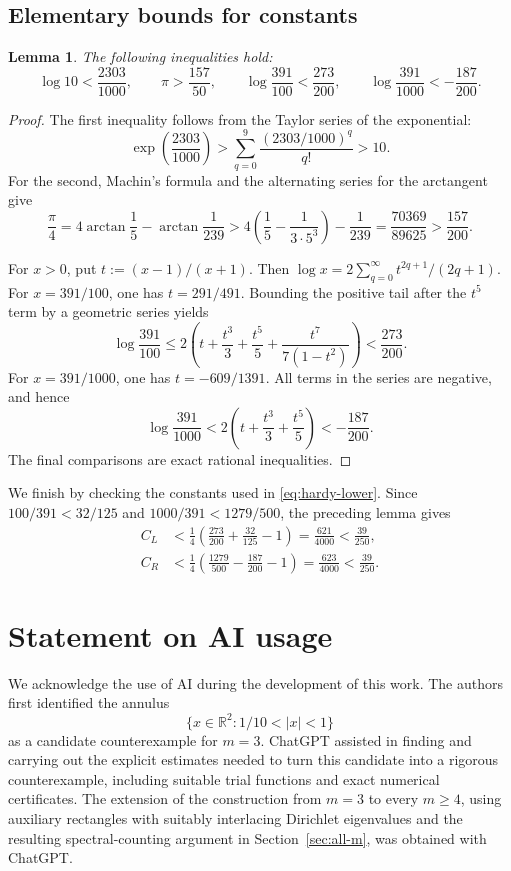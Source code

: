 \documentclass[11pt,letterpaper,reqno]{amsart}
\newtheorem{lemma}[lemma]{Lemma}
\theoremstyle{definition}
\begin{document}
\subsection{Elementary bounds for constants}

\begin{lemma}\label{lem:elementary-constants}
The following inequalities hold:
\[
 \log 10<\frac{2303}{1000},
 \qquad
 \pi>\frac{157}{50},
 \qquad
 \log\frac{391}{100}<\frac{273}{200},
 \qquad
 \log\frac{391}{1000}< -\frac{187}{200}.
\]
\end{lemma}

\begin{proof}
The first inequality follows from the Taylor series of the exponential:
\[
 \exp\left(\frac{2303}{1000}\right)
 >\sum_{q=0}^{9}\frac{(2303/1000)^q}{q!}>10.
\]
For the second, Machin's formula and the alternating series for the arctangent
give
\[
 \frac\pi4
 =4\arctan\frac15-\arctan\frac1{239}
 >4\left(\frac15-\frac{1}{3\cdot5^3}\right)-\frac1{239}
 =\frac{70369}{89625}>\frac{157}{200}.
\]

For $x>0$, put $t:=(x-1)/(x+1)$.  Then
$\log x=2\sum_{q=0}^\infty t^{2q+1}/(2q+1)$.  For $x=391/100$, one has
$t=291/491$.  Bounding the positive tail after the $t^5$ term by a geometric
series yields
\[
 \log\frac{391}{100}
 \leq2\left(t+\frac{t^3}{3}+\frac{t^5}{5}
 +\frac{t^7}{7(1-t^2)}\right)<\frac{273}{200}.
\]
For $x=391/1000$, one has $t=-609/1391$.  All terms in the series are
negative, and hence
\[
 \log\frac{391}{1000}
 <2\left(t+\frac{t^3}{3}+\frac{t^5}{5}\right)< -\frac{187}{200}.
\]
The final comparisons are exact rational inequalities.
\end{proof}

We finish by checking the constants used in \eqref{eq:hardy-lower}.  Since
$100/391<32/125$ and $1000/391<1279/500$, the preceding lemma gives
\begin{align*}
 C_L
 &<\frac14\left(\frac{273}{200}+\frac{32}{125}-1\right)
 =\frac{621}{4000}<\frac{39}{250},\\
 C_R
 &<\frac14\left(\frac{1279}{500}-\frac{187}{200}-1\right)
 =\frac{623}{4000}<\frac{39}{250}.
\end{align*}




\section*{Statement on AI usage}

We acknowledge the use of AI during the development of this work.
The authors first identified the annulus
\[
\{x\in\mathbb{R}^2:1/10<|x|<1\}
\]
as a candidate counterexample for \(m=3\). ChatGPT assisted in finding and
carrying out the explicit estimates needed to turn this candidate into a
rigorous counterexample, including suitable trial functions and exact
numerical certificates. The extension of the construction from \(m=3\) to
every \(m\geq4\), using auxiliary rectangles with suitably interlacing
Dirichlet eigenvalues and the resulting spectral-counting argument in
Section~\ref{sec:all-m}, was obtained with ChatGPT.
\end{document}

